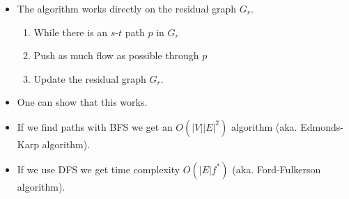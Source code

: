 \documentclass{beamer}
\begin{document}
\begin{frame}[fragile]
\begin{itemize}
 \item The algorithm works directly on the residual graph $G_r$.
 
 \begin{enumerate}
  \item While there is an $s$-$t$ path $p$ in $G_r$
 \item \quad Push as much flow as possible through $p$
 \item \quad Update the residual graph $G_r$.
 \end{enumerate}

 \item One can show that this works.
 
 \item If we find paths with BFS we get an $O(|V| |E|^2)$ algorithm (aka. Edmonds-Karp algorithm).
 
 \item If we use DFS we get time complexity $O(|E| f^*)$ (aka. Ford-Fulkerson algorithm).
 
\end{itemize}

\end{frame}
\end{document}
